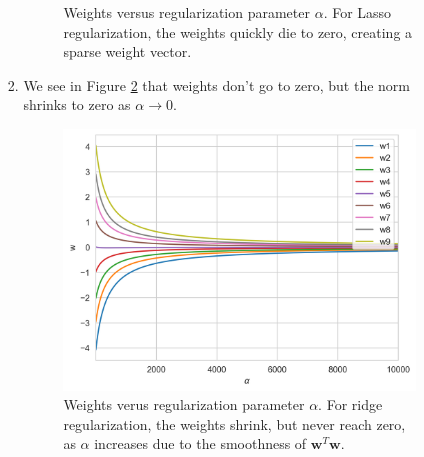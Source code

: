 \documentclass[12pt]{article}
\newcommand{\w}{\mathbf w}
\begin{document}
\begin{enumerate}[leftmargin=*]
\begin{enumerate}[label = \Alph*.]
\begin{enumerate}
\begin{figure}[h!]
\caption{Weights versus regularization parameter $\alpha$. For Lasso regularization, the weights quickly die to zero, creating a sparse weight vector.} \label{lasso}
\end{figure}
\item We see in Figure \ref{ridgealpha} that weights don't go to zero, but the norm shrinks to zero as $\alpha \to 0$.
\begin{figure}[h!]
\centering
\includegraphics[scale=0.6]{ridgealpha.png}
\caption{Weights verus regularization parameter $\alpha$. For ridge regularization, the weights shrink, but never reach zero, as $\alpha$ increases due to the smoothness of $\w^T \w$.} \label{ridgealpha}
\end{figure}


\end{enumerate}
\end{enumerate}
\end{enumerate}
\end{document}
